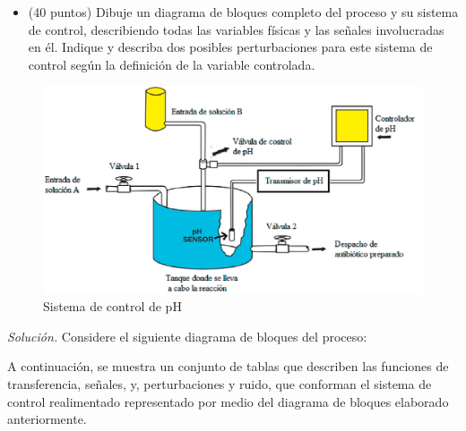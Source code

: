 \begin{itemize}
    \item (40 puntos) Dibuje un diagrama de bloques completo del proceso y su sistema de control, describiendo todas las variables físicas y las señales involucradas en él. 
        Indique y describa dos posibles perturbaciones para este sistema de control según la definición de la variable controlada.
\end{itemize}

\begin{figure}[!h]
    \centering
    \includegraphics[width = 0.5\linewidth]{figs/fig1.png}
    \caption{Sistema de control de pH}
    \label{fig1}
\end{figure}

\pagebreak

\textit{Solución.} Considere el siguiente diagrama de bloques del proceso:



A continuación, se muestra un conjunto de tablas que describen las funciones de transferencia, señales, y, perturbaciones y ruido, que conforman el sistema de control realimentado representado por medio del diagrama de bloques elaborado anteriormente.


\pagebreak

\pagebreak

\pagebreak

